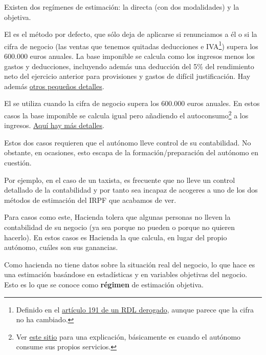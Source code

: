 \documentclass[nochap,palatino,shortheader]{apuntes}
\newcommand{\study}[1]{#1} \newcommand{\substudy}[1]{#1}
\begin{document}
Existen dos regímenes de estimación: la \study{directa} (con \substudy{dos modalidades}) y la \study{objetiva}.

El  es el \study{método por defecto}, que sólo deja de aplicarse \substudy{si renunciamos a él o} si la \substudy{cifra de negocio (las ventas que tenemos quitadas deducciones e IVA}\footnote{Definido en el \href{http://www.boe.es/buscar/doc.php?id=BOE-A-1989-30361}{artículo 191 de un RDL derogado}, aunque parece que la cifra no ha cambiado.}) \substudy{supera los 600.000 euros anuales}.
La \substudy{base imponible} se calcula como los \substudy{ingresos menos los gastos y deducciones}, \substudy{incluyendo} además una \substudy{deducción del 5\% del rendimiento neto} del ejercicio anterior para provisiones y gastos de difícil justificación.
Hay además \href{http://portal.circe.es/es-ES/emprendedor/EmpresarioIndividual/TributacionAutonomos/Paginas/AutonomoEstimacionDirectaSimplificada.aspx}{otros pequeños detalles}.

El  se utiliza cuando la cifra de negocio \substudy{supera los 600.000 euros anuales}.
En estos casos la \substudy{base imponible} se calcula igual pero \substudy{añadiendo el autoconsumo}\footnote{Ver \href{http://www.pymesyautonomos.com/fiscalidad-y-contabilidad/el-autoconsumo-de-bienes-y-servicios-tratamiento-fiscal-y-contable}{este sitio} para una explicación, básicamente es cuando el autónomo consume sus propios servicios.} a los ingresos. \href{http://portal.circe.es/es-ES/emprendedor/EmpresarioIndividual/TributacionAutonomos/Paginas/autonomoestimacionDirectaNormal.aspx}{Aquí hay más detalles}.

Estos dos casos requieren que el autónomo lleve control de su contabilidad. No obstante, en ocasiones, esto escapa de la formación/preparación del autónomo en cuestión.

Por ejemplo, en el caso de un taxista, es frecuente que no lleve un control detallado de la contabilidad y por tanto sea incapaz de acogeres a uno de los dos métodos de estimación del IRPF que acabamos de ver.

Para casos como este, Hacienda tolera que algunas personas no lleven la contabilidad de su negocio (ya sea porque no pueden o porque no quieren hacerlo). En estos casos es Hacienda la que calcula, en lugar del propio autónomo, cuáles son sus ganancias.

Como hacienda no tiene datos sobre la situación real del negocio, lo que hace es una estimación basándose en estadísticas y en variables objetivas del negocio. Esto es lo que se conoce como \textbf{régimen} de estimación objetiva.
\end{document}
